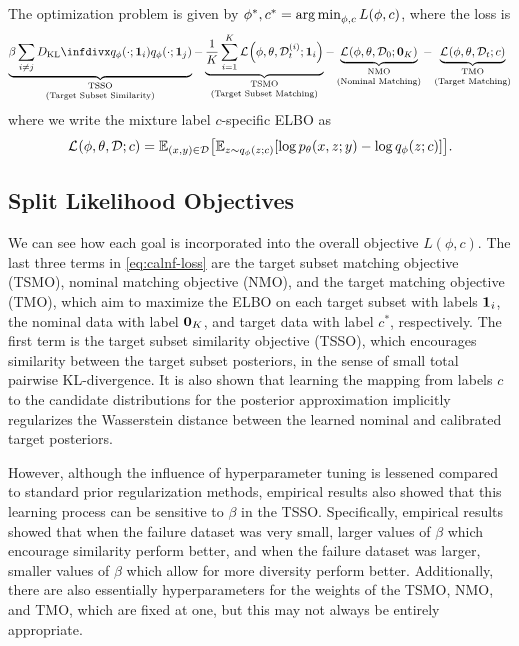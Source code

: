 \begin{proposition}
    The optimization problem is given by $\phi^*, c^* = \operatorname*{arg\,min}_{\phi, c} L(\phi, c)$, where the loss is
    \begin{equation}
        \label{eq:calnf-loss}
        \underbrace{\beta\sum_{i\ne j} \DKL{\qvd{\cdot;\vone_i}}{\qvd{\cdot;\vone_j}}}_{\substack{\mathstrut\text{TSSO}\mathstrut\\\text{(Target Subset Similarity)}}}
        -\underbrace{\frac1K \sum_{i=1}^K \elbo{}{\phi,\theta,\Data_t^{(i)};\vone_i}}_{\substack{\mathstrut\text{TSMO}\mathstrut\\\text{(Target Subset Matching)}}}
        -\underbrace{\elbo{}{\phi,\theta,\Data_0;\vzero_K}}_{\substack{\mathstrut\text{NMO}\mathstrut\\\text{(Nominal Matching)}}}
        -\underbrace{\elbo{}{\phi,\theta,\Data_t;c}}_{\substack{\mathstrut\text{TMO}\mathstrut\\\text{(Target Matching)}}}
    \end{equation}
    where we write the mixture label $c$-specific ELBO as
    \begin{equation}
        \elbo{}{\phi, \theta, \Data; c} = \EX{(x,y)\in \Data}{ \EX{z\sim \qvd{z;c}}{\log\pld{x,z;y}-\log\qvd{z;c}} }.
    \end{equation}
\end{proposition}

\subsection{Split Likelihood Objectives}

We can see how each goal is incorporated into the overall objective $L(\phi,c)$. The last three terms in \cref{eq:calnf-loss} are the target subset matching objective (TSMO), nominal matching objective (NMO), and the target matching objective (TMO), which aim to maximize the ELBO on each target subset with labels $\mathbf{1}_i$, the nominal data with label $\mathbf{0}_K$, and target data with label $c^*$, respectively. The first term is the target subset similarity objective (TSSO), which encourages similarity between the target subset posteriors, in the sense of small total pairwise KL-divergence. It is also shown that learning the mapping from labels $c$ to the candidate distributions for the posterior approximation implicitly regularizes the Wasserstein distance between the learned nominal and calibrated target posteriors.

However, although the influence of hyperparameter tuning is lessened compared to standard prior regularization methods, empirical results also showed that this learning process can be sensitive to $\beta$ in the TSSO. Specifically, empirical results showed that when the failure dataset was very small, larger values of $\beta$ which encourage similarity perform better, and when the failure dataset was larger, smaller values of $\beta$ which allow for more diversity perform better. Additionally, there are also essentially hyperparameters for the weights of the TSMO, NMO, and TMO, which are fixed at one, but this may not always be entirely appropriate.

